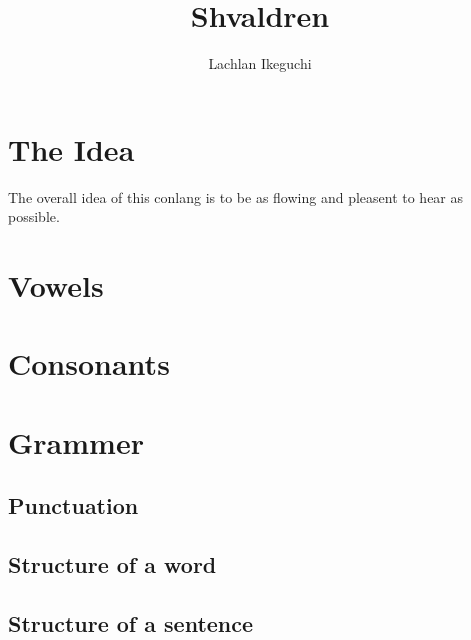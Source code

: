\documentclass{article}
\title{Shvaldren}
\author{Lachlan Ikeguchi}
\begin{document}
\maketitle
\tableofcontents


\section{The Idea}
The overall idea of this conlang is to be as flowing and pleasent to hear as possible.



\section{Vowels}


\section{Consonants}


\section{Grammer}
\subsection{Punctuation}


\subsection{Structure of a word}


\subsection{Structure of a sentence}
\end{document}
